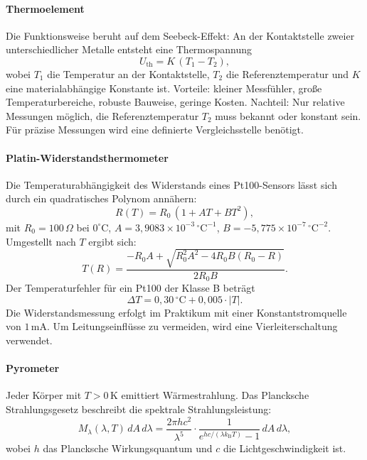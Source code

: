 \paragraph{Thermoelement}
Die Funktionsweise beruht auf dem Seebeck-Effekt: An der Kontaktstelle zweier unterschiedlicher Metalle entsteht eine Thermospannung
\begin{equation}
    U_{\mathrm{th}} = K \, (T_1 - T_2),
\end{equation}
wobei $T_1$ die Temperatur an der Kontaktstelle, $T_2$ die Referenztemperatur und $K$ eine materialabhängige Konstante ist.  
Vorteile: kleiner Messfühler, große Temperaturbereiche, robuste Bauweise, geringe Kosten.  
Nachteil: Nur relative Messungen möglich, die Referenztemperatur $T_2$ muss bekannt oder konstant sein. Für präzise Messungen wird eine definierte Vergleichsstelle benötigt.  

\paragraph{Platin-Widerstandsthermometer}
Die Temperaturabhängigkeit des Widerstands eines Pt100-Sensors lässt sich durch ein quadratisches Polynom annähern:
\begin{equation}
    R(T) = R_0 \,(1 + A T + B T^2),
\end{equation}
mit $R_0 = 100\,\Omega$ bei $0^\circ$C, $A = 3{,}9083 \times 10^{-3}\,\mathrm{^\circ C^{-1}}$, $B = -5{,}775 \times 10^{-7}\,\mathrm{^\circ C^{-2}}$.  
Umgestellt nach $T$ ergibt sich:
\begin{equation}
    T(R) = \frac{-R_0A + \sqrt{R_0^2 A^2 - 4 R_0 B (R_0 - R)}}{2 R_0 B}.
\end{equation}
Der Temperaturfehler für ein Pt100 der Klasse B beträgt
\begin{equation}
    \Delta T = 0{,}30\,^\circ\mathrm{C} + 0{,}005 \cdot |T|.
\end{equation}
Die Widerstandsmessung erfolgt im Praktikum mit einer Konstantstromquelle von $1\,$mA. Um Leitungseinflüsse zu vermeiden, wird eine Vierleiterschaltung verwendet.

\paragraph{Pyrometer}
Jeder Körper mit $T > 0\,$K emittiert Wärmestrahlung. Das Plancksche Strahlungsgesetz beschreibt die spektrale Strahlungsleistung:
\begin{equation}
    M_\lambda(\lambda,T)\,dA\,d\lambda = \frac{2\pi h c^2}{\lambda^5} \cdot \frac{1}{e^{hc/(\lambda k_{\mathrm{B}}T)} - 1} \, dA\,d\lambda,
\end{equation}
wobei $h$ das Plancksche Wirkungsquantum und $c$ die Lichtgeschwindigkeit ist.  

